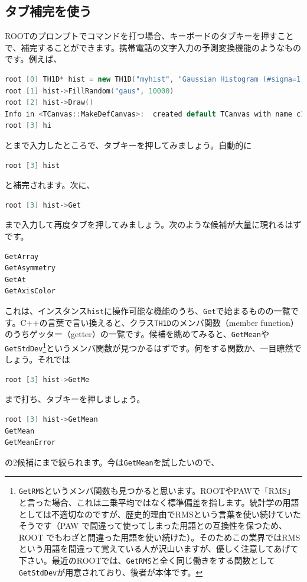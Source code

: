 {\subsection{タブ補完を使う}
ROOTのプロンプトでコマンドを打つ場合、キーボードのタブキーを押すことで、補完することができます。携帯電話の文字入力の予測変換機能のようなものです。例えば、
\begin{lstlisting}[language=c++]
root [0] TH1D* hist = new TH1D("myhist", "Gaussian Histogram (#sigma=1)", 50, -5, 5)
root [1] hist->FillRandom("gaus", 10000)
root [2] hist->Draw()
Info in <TCanvas::MakeDefCanvas>:  created default TCanvas with name c1
root [3] hi
\end{lstlisting}
とまで入力したところで、タブキーを押してみましょう。自動的に
\begin{lstlisting}[language=c++]
root [3] hist
\end{lstlisting}
と補完されます。次に、
\begin{lstlisting}[language=c++]
root [3] hist->Get
\end{lstlisting}
まで入力して再度タブを押してみましょう。次のような候補が大量に現れるはずです。
\begin{lstlisting}[language=c++]
GetArray
GetAsymmetry
GetAt
GetAxisColor
\end{lstlisting}
これは、インスタンス\texttt{hist}に操作可能な機能のうち、\texttt{Get}で始まるものの一覧です。C++の言葉で言い換えると、クラス\texttt{TH1D}のメンバ関数（member function）のうちゲッター（getter）の一覧です。候補を眺めてみると、\texttt{GetMean}や\texttt{GetStdDev}\footnote{\texttt{GetRMS}というメンバ関数も見つかると思います。ROOTやPAWで「RMS」と言った場合、これは二乗平均ではなく標準偏差を指します。統計学の用語としては不適切なのですが、歴史的理由でRMSという言葉を使い続けていたそうです（PAW で間違って使ってしまった用語との互換性を保つため、ROOT でもわざと間違った用語を使い続けた）。そのためこの業界ではRMSという用語を間違って覚えている人が沢山いますが、優しく注意してあげて下さい。最近のROOTでは、\texttt{GetRMS}と全く同じ働きをする関数として\texttt{GetStdDev}が用意されており、後者が本体です。}というメンバ関数が見つかるはずです。何をする関数か、一目瞭然でしょう。それでは
\begin{lstlisting}[language=c++]
root [3] hist->GetMe
\end{lstlisting}
まで打ち、タブキーを押しましょう。
\begin{lstlisting}[language=c++]
root [3] hist->GetMean
GetMean
GetMeanError
\end{lstlisting}
の2候補にまで絞られます。今は\texttt{GetMean}を試したいので、
}
